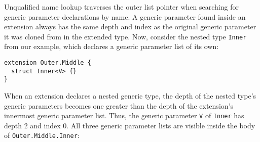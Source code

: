 \documentclass[../generics]{subfiles}
\begin{document}
Unqualified name lookup traverses the outer list pointer when searching for generic parameter declarations by name. A generic parameter found inside an extension always has the same depth and index as the original generic parameter it was cloned from in the extended type. Now, consider the nested type \texttt{Inner} from our example, which declares a generic parameter list of its own:
\begin{Verbatim}
extension Outer.Middle {
  struct Inner<V> {}
}
\end{Verbatim}
When an extension declares a nested generic type, the depth of the nested type's generic parameters becomes one greater than the depth of the extension's innermost generic parameter list. Thus, the generic parameter \texttt{V} of \texttt{Inner} has depth 2 and index 0. All three generic parameter lists are visible inside the body of \texttt{Outer.Middle.Inner}:
\begin{quote}
\end{quote}
\end{document}

